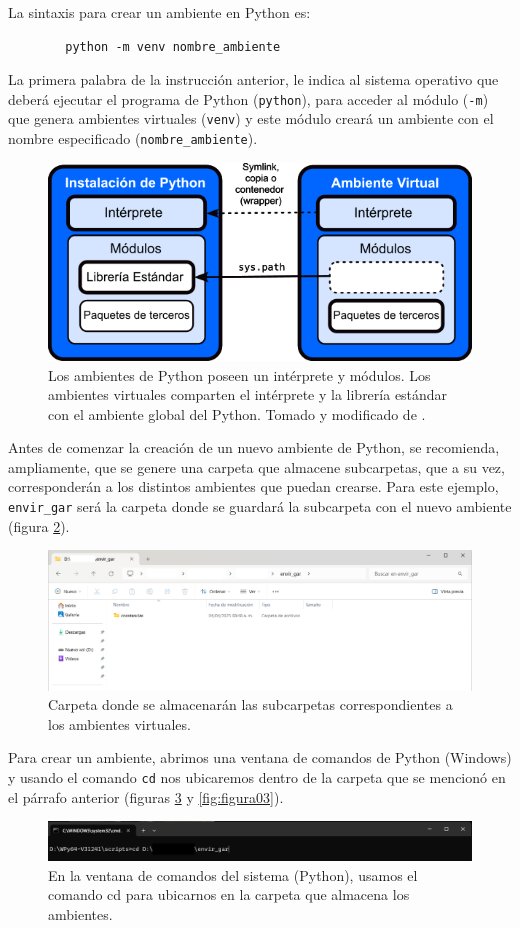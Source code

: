\documentclass{article}
\begin{document}
	La sintaxis para crear un ambiente en Python  es:
	\begin{verbatim}
		python -m venv nombre_ambiente
	\end{verbatim}
	
	La primera palabra de la instrucción anterior, le indica al sistema operativo que deberá ejecutar el programa de Python (\texttt{python}), para acceder al módulo (\texttt{-m}) que genera ambientes virtuales (\texttt{venv}) y este módulo creará un ambiente con el nombre especificado (\texttt{nombre\_ambiente}).\bigskip
	\begin{figure}[H]
		\centering
		\includegraphics[width=0.5\linewidth]{ambienteVirtual}
		\caption{Los ambientes de Python poseen un intérprete y módulos. Los ambientes virtuales comparten el intérprete y la librería estándar con el ambiente global del Python. Tomado y modificado de \citet{jolowicz2024}.}
		\label{fig:ambienteVirtual}
	\end{figure}
	
	
	Antes de comenzar la creación de un nuevo ambiente de Python, se recomienda, ampliamente, que se genere una carpeta que almacene subcarpetas, que a su vez, corresponderán a los distintos ambientes que puedan crearse. Para este ejemplo, \texttt{envir\_gar} será la carpeta donde se guardará la subcarpeta con el nuevo ambiente (figura \ref{fig:figura01}).
	
	\begin{figure}[H]
		\centering
		\includegraphics[width=0.8\linewidth]{figura01}
		\caption{Carpeta donde se almacenarán las subcarpetas correspondientes a los ambientes virtuales.}
		\label{fig:figura01}
	\end{figure}
	
	Para crear un ambiente, abrimos una ventana de comandos de Python (Windows) y usando el comando \texttt{cd} nos ubicaremos dentro de la carpeta que se mencionó en el párrafo anterior (figuras \ref{fig:figura02} y \ref{fig:figura03}).
	\begin{figure}[H]
		\centering
		\includegraphics[width=0.9\linewidth]{figura02}
		\caption{En la ventana de comandos del sistema (Python), usamos el comando cd para  ubicarnos en la carpeta que almacena los ambientes.}
		\label{fig:figura02}
	\end{figure}
	
\end{document}
